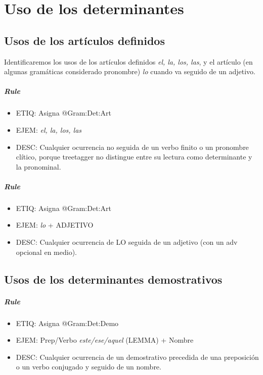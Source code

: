 \documentclass[11pt]{report}
\begin{document}
\chapter{Uso de los determinantes}
\section{Usos de los artículos definidos}
Identificaremos los usos de los artículos definidos \emph{el, la, los, las}, y el artículo (en algunas gramáticas considerado pronombre) \emph{lo} cuando va seguido de un adjetivo.

\paragraph*{Rule}
\begin{itemize}
\item ETIQ: Asigna @Gram:Det:Art
\item EJEM: \emph{el, la, los, las}
\item DESC: Cualquier ocurrencia no seguida de un verbo finito o un pronombre clítico, porque treetagger no distingue entre su lectura como determinante y la pronominal.
\end{itemize}

\paragraph*{Rule}
\begin{itemize}
\item ETIQ: Asigna @Gram:Det:Art
\item EJEM: \emph{lo} + ADJETIVO
\item DESC: Cualquier ocurrencia de LO seguida de un adjetivo (con un adv opcional en medio).
\end{itemize}

\section{Usos de los determinantes demostrativos}
\paragraph*{Rule}
\begin{itemize}
\item ETIQ: Asigna @Gram:Det:Demo
\item EJEM: Prep/Verbo \emph{este/ese/aquel} (LEMMA) + Nombre
\item DESC: Cualquier ocurrencia de un demostrativo precedida de una preposición o un verbo conjugado y seguido de un nombre.
\end{itemize}
\end{document}
